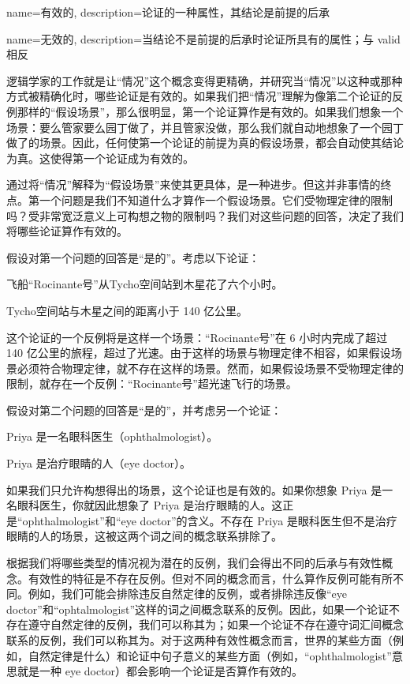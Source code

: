 {
name=有效的,
description={论证的一种属性，其结论是前提的后承}
}

{
name=无效的,
description={当结论不是前提的后承时论证所具有的属性；与 \gls{valid} 相反}
}

逻辑学家的工作就是让“情况”这个概念变得更精确，并研究当“情况”以这种或那种方式被精确化时，哪些论证是有效的。如果我们把“情况”理解为像第二个论证的反例那样的“假设场景”，那么很明显，第一个论证算作是有效的。如果我们想象一个场景：要么管家要么园丁做了，并且管家没做，那么我们就自动地想象了一个园丁做了的场景。因此，任何使第一个论证的前提为真的假设场景，都会自动使其结论为真。这使得第一个论证成为有效的。

通过将“情况”解释为“假设场景”来使其更具体，是一种进步。但这并非事情的终点。第一个问题是我们不知道什么才算作一个假设场景。它们受物理定律的限制吗？受非常宽泛意义上可构想之物的限制吗？我们对这些问题的回答，决定了我们将哪些论证算作有效的。

假设对第一个问题的回答是“是的”。考虑以下论证：


\begin{earg}
		\item[] 飞船“Rocinante号”从Tycho空间站到木星花了六个小时。
		\item[\texttherefore] Tycho空间站与木星之间的距离小于 140 亿公里。
	\end{earg}


这个论证的一个反例将是这样一个场景：“Rocinante号”在 6 小时内完成了超过 140 亿公里的旅程，超过了光速。由于这样的场景与物理定律不相容，如果假设场景必须符合物理定律，就不存在这样的场景。然而，如果假设场景不受物理定律的限制，就存在一个反例：“Rocinante号”超光速飞行的场景。

假设对第二个问题的回答是“是的”，并考虑另一个论证：


\begin{earg}
		\item[] Priya 是一名眼科医生（ophthalmologist）。
		\item[\texttherefore] Priya 是治疗眼睛的人（eye doctor）。
	\end{earg}


如果我们只允许构想得出的场景，这个论证也是有效的。如果你想象 Priya 是一名眼科医生，你就因此想象了 Priya 是治疗眼睛的人。这正是“ophthalmologist”和“eye doctor”的含义。不存在 Priya 是眼科医生但不是治疗眼睛的人的场景，这被这两个词之间的概念联系排除了。

根据我们将哪些类型的情况视为潜在的反例，我们会得出不同的后承与有效性概念。有效性的特征是不存在反例。但对不同的概念而言，什么算作反例可能有所不同。例如，我们可能会排除违反自然定律的反例，或者排除违反像“eye doctor”和“ophtalmologist”这样的词之间概念联系的反例。因此，如果一个论证不存在遵守自然定律的反例，我们可以称其为；如果一个论证不存在遵守词汇间概念联系的反例，我们可以称其为。对于这两种有效性概念而言，世界的某些方面（例如，自然定律是什么）和论证中句子意义的某些方面（例如，“ophthalmologist”意思就是一种 eye doctor）都会影响一个论证是否算作有效的。

